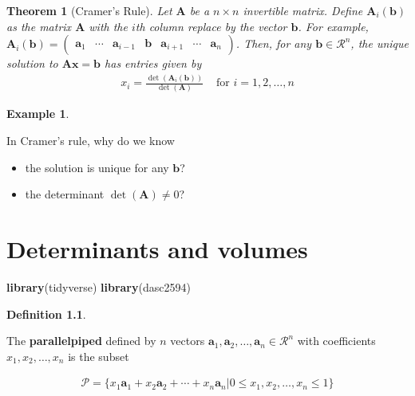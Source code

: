 \documentclass[
]{book}
\newenvironment{Shaded}{\begin{snugshade}}{\end{snugshade}}
\newcommand{\KeywordTok}[1]{\textcolor[rgb]{0.13,0.29,0.53}{\textbf{#1}}}
\newcommand{\NormalTok}[1]{#1}
\newtheorem{theorem}{Theorem}[chapter]
\theoremstyle{definition}
\newtheorem{definition}{Definition}[chapter]
\theoremstyle{definition}
\newtheorem{example}{Example}[chapter]
\theoremstyle{definition}
\theoremstyle{remark}
\begin{document}
\begin{theorem}[Cramer's Rule]
\protect\hypertarget{thm:unnamed-chunk-211}{}{\label{thm:unnamed-chunk-211} {} }Let \(\mathbf{A}\) be a \(n \times n\) invertible matrix. Define \(\mathbf{A}_i(\mathbf{b})\) as the matrix \(\mathbf{A}\) with the \(i\)th column replace by the vector \(\mathbf{b}\). For example, \(\mathbf{A}_i(\mathbf{b}) = \begin{pmatrix} \mathbf{a}_1 & \cdots & \mathbf{a}_{i-1} & \mathbf{b} & \mathbf{a}_{i+1} & \cdots & \mathbf{a}_n \end{pmatrix}\). Then, for any \(\mathbf{b} \in \mathcal{R}^n\), the unique solution to \(\mathbf{A} \mathbf{x} = \mathbf{b}\) has entries given by
\[
\begin{aligned}
x_i = \frac{\det(\mathbf{A}_i(\mathbf{b}))}{\det(\mathbf{A})} & \mbox{ for } i = 1, 2, \ldots, n
\end{aligned}
\]
\end{theorem}

\begin{example}
\protect\hypertarget{exm:unlabeled-div-109}{}\label{exm:unlabeled-div-109}

In Cramer's rule, why do we know

\begin{itemize}
\item
  the solution is unique for any \(\mathbf{b}\)?
\item
  the determinant \(\det(\mathbf{A}) \neq 0\)?
\end{itemize}

\end{example}

\hypertarget{determinants-and-volumes}{%
\chapter{Determinants and volumes}\label{determinants-and-volumes}}

\begin{Shaded}
\begin{Highlighting}[]
\KeywordTok{library}\NormalTok{(tidyverse)}
\KeywordTok{library}\NormalTok{(dasc2594)}
\end{Highlighting}
\end{Shaded}

\begin{definition}
\protect\hypertarget{def:parallelpiped}{}\label{def:parallelpiped}

The \textbf{parallelpiped} defined by \(n\) vectors \(\mathbf{a}_1, \mathbf{a}_2, \ldots, \mathbf{a}_n \in \mathcal{R}^n\) with coefficients \(x_1, x_2, \ldots, x_n\) is the subset

\[
\begin{aligned}
\mathcal{P} = \{x_1 \mathbf{a}_1 + x_2 \mathbf{a}_2 + \cdots + x_n \mathbf{a}_n | 0 \leq x_1, x_2, \ldots, x_n \leq 1 \}
\end{aligned}
\]

\end{definition}
\end{document}
